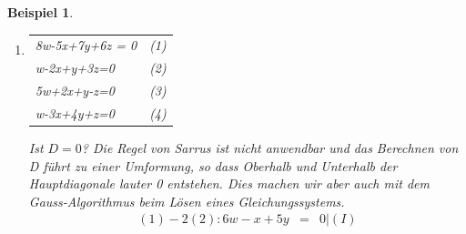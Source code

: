 \documentclass[a4paper,10pt]{report}
\newtheorem{myexample}{Beispiel}
\begin{document}
\begin{myexample}
\begin{enumerate}
\begin{eqnarray*}
\begin{tikzpicture}[>=stealth]
    \foreach \c in {1,2,3} {\node[anchor=south] at (sarrus-1-\c.north) {$+$};};
    \foreach \c in {1,2,3} {\node[anchor=north] at (sarrus-3-\c.south) {$-$};};
\end{tikzpicture}\\
		&&= 2 + 2 + 2 -8 + 1 + 1= 0
		\end{eqnarray*}
Keine der Gleichungen ist ein vielfaches einer anderen. Also bilden die 3 Ebenen ein Ebenenbüschel und die gemeinsame Schnittgerade ist die Lösung des Systems.
Ist $x=\alpha$, so wird
\begin{eqnarray*}
\alpha - 2y+z&=&0\\
2\alpha -y-z&=&0
\end{eqnarray*}
Addiert:
\begin{eqnarray*}
3\alpha - 3y &=& 0\\
y &=& \alpha
\end{eqnarray*}
eingesetzt in (1):
\begin{eqnarray*}
\alpha - 2\alpha + z &=& 0\\
z &=& \alpha
\end{eqnarray*}
Wir müssen nicht noch (1) und (3) oder (2) und (3) betrachten, da wir wissen, dass die Schnittgerade zu allen 3 Ebenen gehört. Also ist
\begin{eqnarray*}
x&=&\alpha\\
y&=& \alpha\\
z&=&\alpha
\shortintertext{denn}
s:\vec{p} = \alpha \begin{pmatrix}1\\1\\1\end{pmatrix}, \alpha \in \mathbb{R}
\end{eqnarray*}
\newpage
\item
\begin{center}
\begin{tabular}{|l|l}
8w-5x+7y+6z = 0&(1)\\
w-2x+y+3z=0&(2)\\
5w+2x+y-z=0&(3)\\
w-3x+4y+z=0&(4)
\end{tabular}
\end{center}
Ist $D=0$? Die Regel von Sarrus ist nicht anwendbar und das Berechnen von D führt zu einer Umformung, so dass Oberhalb und Unterhalb der Hauptdiagonale lauter 0 entstehen. Dies machen wir aber auch mit dem Gauss-Algorithmus beim Lösen eines Gleichungssystems.
\begin{eqnarray*}
(1)-2(2): 6w-x+5y&=&0 |(I)\\

\end{eqnarray*}
\end{enumerate}
\end{myexample}
\end{document}
